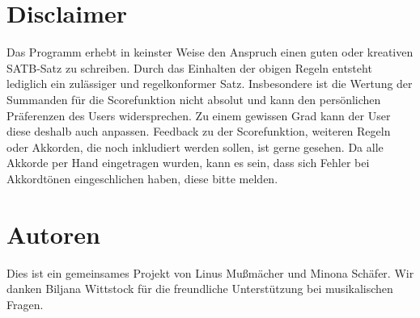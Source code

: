 \documentclass[11.5pt,a4paper]{article}
\begin{document}
\section{Disclaimer}
Das Programm erhebt in keinster Weise den Anspruch einen guten oder kreativen SATB-Satz zu schreiben. Durch das Einhalten der obigen Regeln entsteht lediglich ein zulässiger und regelkonformer Satz. Insbesondere ist die Wertung der Summanden für die Scorefunktion nicht absolut und kann den persönlichen Präferenzen des Users widersprechen. Zu einem gewissen Grad kann der User diese deshalb auch anpassen. Feedback zu der Scorefunktion, weiteren Regeln oder Akkorden, die noch inkludiert werden sollen, ist gerne gesehen. Da alle Akkorde per Hand eingetragen wurden, kann es sein, dass sich Fehler bei Akkordtönen eingeschlichen haben, diese bitte melden. 

\section{Autoren}
Dies ist ein gemeinsames Projekt von Linus Mußmächer und Minona Schäfer. Wir danken Biljana Wittstock für die freundliche Unterstützung bei musikalischen Fragen. 
\end{document}
